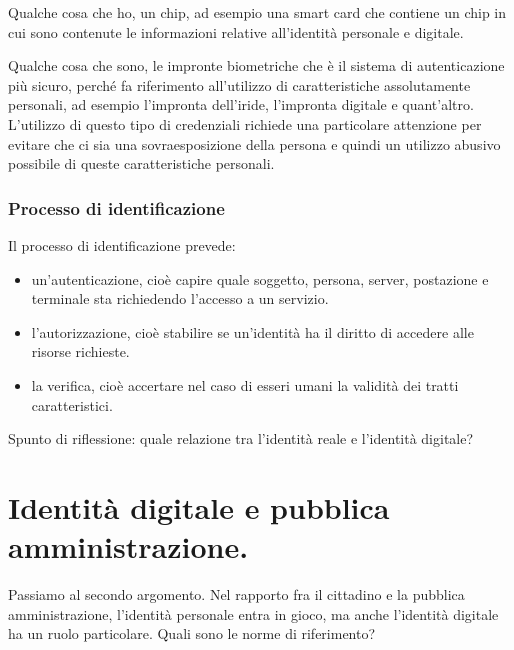 Qualche cosa che ho, un chip, ad esempio una smart card che contiene un chip in cui sono contenute le informazioni relative all'identità personale e digitale.

Qualche cosa che sono, le impronte biometriche che è il sistema di autenticazione più sicuro, perché fa riferimento all'utilizzo di caratteristiche assolutamente personali, ad esempio l'impronta dell'iride, l'impronta digitale e quant'altro. L'utilizzo di questo tipo di credenziali richiede una particolare attenzione per evitare che ci sia una sovraesposizione della persona e quindi un utilizzo abusivo possibile di queste caratteristiche personali.

\subsubsection{Processo di identificazione }

Il processo di identificazione prevede:

\begin{itemize}
    \item un'autenticazione, cioè capire quale soggetto, persona, server, postazione e terminale sta richiedendo l'accesso a un servizio.
    \item l'autorizzazione, cioè stabilire se un'identità ha il diritto di accedere alle risorse richieste.
    \item la verifica, cioè accertare nel caso di esseri umani la validità dei tratti caratteristici.
\end{itemize}

Spunto di riflessione: quale relazione tra l'identità reale e l'identità digitale?

\section{Identità digitale e pubblica amministrazione.}

Passiamo al secondo argomento.  Nel rapporto fra il cittadino e la pubblica amministrazione, l'identità personale  entra in gioco, ma anche l'identità digitale ha un ruolo particolare. Quali sono le norme di riferimento?


